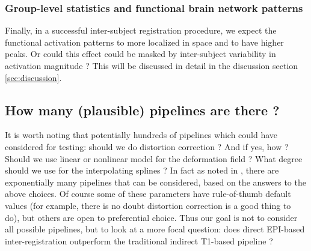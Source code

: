


\subsubsection{Group-level statistics and functional brain network patterns}
Finally, in a successful inter-subject registration procedure, we
expect the functional activation patterns to more localized in space
and to have higher peaks. Or could this effect could be
masked by inter-subject variability in activation magnitude ?
This will be discussed in detail in the discussion section \ref{sec:discussion}.

\subsection{How many (plausible) pipelines are there ?}
It is worth noting that potentially hundreds of pipelines which could
have considered for testing: should we do distortion correction ? And
if yes, how ? Should we use linear or nonlinear model for the
deformation field ?
%
What degree should we use for the interpolating splines ? In fact as
noted in \citep{Poldrack059188}, there are exponentially many pipelines
that can be considered, based on the answers to the above choices.
%
Of course some of these parameters have rule-of-thumb default values
(for example, there is no doubt distortion correction is a good thing
to do), but others are open to preferential choice. Thus our goal is
not to consider all possible pipelines, but to look at a more focal
question: does direct EPI-based inter-registration outperform the
traditional indirect T1-based pipeline ?


